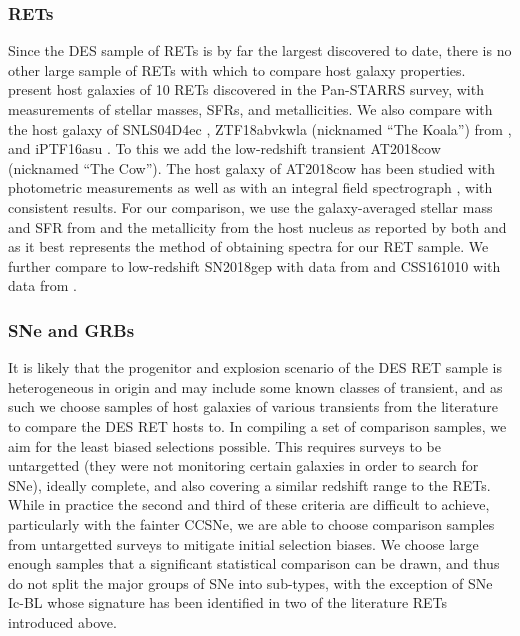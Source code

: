 \documentclass[fleqn,usenatbib,]{mnras}
\newcommand{\replyref}[1]{\color{magenta}#1 \color{black}}
\begin{document}
\subsubsection{RETs \label{subsubsec:compare_rets}}
Since the DES sample of RETs is by far the largest discovered to date, there is no other large sample of RETs with which to compare host galaxy properties. \citet{Drout2014} present host galaxies of 10 RETs discovered in the Pan-STARRS survey, with measurements of stellar masses, SFRs, and metallicities. We also compare with the host galaxy of SNLS04D4ec \citep{Arcavi2016} \replyref{, ZTF18abvkwla (nicknamed ``The Koala'') from \citet{Ho2020}, and iPTF16asu \citep{Whitesides2017}.} To this we add the low-redshift transient AT2018cow (nicknamed ``The Cow''). The host galaxy of AT2018cow has been studied with photometric measurements \citep{Perley2019} as well as with an integral field spectrograph \citep{Lyman2020}, with consistent results. For our comparison, we use the galaxy-averaged stellar mass and SFR from \citet{Lyman2020} and the metallicity from the host nucleus as reported by both \citet{Morokuma-Matsui2019} and \citet{Lyman2020} as it best represents the method of obtaining spectra for our RET sample. We further compare to low-redshift SN2018gep with data from \citet{Ho2019a} \replyref{and CSS161010 with data from \citet{Coppejans2020}.}

\subsubsection{SNe and GRBs \label{subsubsec:compare_CCSNe}}
\replyref{It is likely that the progenitor and explosion scenario of the DES RET sample is heterogeneous in origin and may include some known classes of transient, and as such we choose samples of host galaxies of various transients from the literature to compare the DES RET hosts to.}
In compiling a set of comparison samples, we aim for the least biased selections possible. This requires surveys to be untargetted (they were not monitoring certain galaxies in order to search for SNe), ideally complete, and also covering a similar redshift range to the RETs. While in practice the second and third of these criteria are difficult to achieve, particularly with the fainter CCSNe, we are able to choose comparison samples from untargetted surveys to mitigate initial selection biases.
\replyref{We choose large enough samples that a significant statistical comparison can be drawn, and thus do not split the major groups of SNe into sub-types, with the exception of SNe Ic-BL whose signature has been identified in two of the literature RETs introduced above.}
\end{document}
